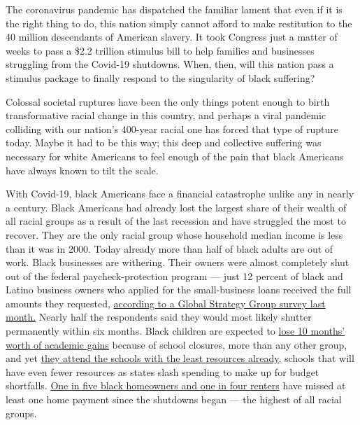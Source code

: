 The coronavirus pandemic has dispatched the familiar lament that even if
it is the right thing to do, this nation simply cannot afford to make
restitution to the 40 million descendants of American slavery. It took
Congress just a matter of weeks to pass a \$2.2 trillion stimulus bill
to help families and businesses struggling from the Covid-19 shutdowns.
When, then, will this nation pass a stimulus package to finally respond
to the singularity of black suffering?

Colossal societal ruptures have been the only things potent enough to
birth transformative racial change in this country, and perhaps a viral
pandemic colliding with our nation's 400-year racial one has forced that
type of rupture today. Maybe it had to be this way; this deep and
collective suffering was necessary for white Americans to feel enough of
the pain that black Americans have always known to tilt the scale.

With Covid-19, black Americans face a financial catastrophe unlike any
in nearly a century. Black Americans had already lost the largest share
of their wealth of all racial groups as a result of the last recession
and have struggled the most to recover. They are the only racial group
whose household median income is less than it was in 2000. Today already
more than half of black adults are out of work. Black businesses are
withering. Their owners were almost completely shut out of the federal
paycheck-protection program --- just 12 percent of black and Latino
business owners who applied for the small-business loans received the
full amounts they requested,
\href{http://publications.unidosus.org/bitstream/handle/123456789/2051/UnidosUS-Color-Of-Change-Federal-Simulus-Survey-Findings.pdf}{according
to a Global Strategy Group survey last month.} Nearly half the
respondents said they would most likely shutter permanently within six
months. Black children are expected to
\href{https://www.mckinsey.com/industries/public-sector/our-insights/covid-19-and-student-learning-in-the-united-states-the-hurt-could-last-a-lifetime}{lose
10 months' worth of academic gains} because of school closures, more
than any other group, and yet
\href{https://edbuild.org/content/23-billion}{they attend the schools
with the least resources already,} schools that will have even fewer
resources as states slash spending to make up for budget shortfalls.
\href{https://www.washingtonpost.com/business/2020/06/13/black-wealth-matters-homeownership-is-key/?arc404=true}{One
in five black homeowners and one in four renters} have missed at least
one home payment since the shutdowns began --- the highest of all racial
groups.

